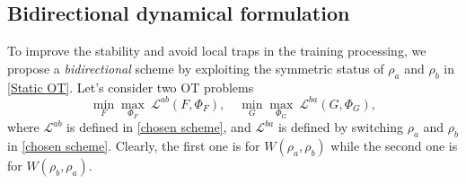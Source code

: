 \documentclass{article}
\newcommand{\zha}[1]{{\color{red} Zha: #1}}
\begin{document}
\subsection{Bidirectional dynamical formulation}
To improve the stability and avoid local traps in the training processing, we propose a {\it bidirectional} scheme by exploiting the symmetric status of $
\rho_a$ and $\rho_b$ in \eqref{Static OT}.  
Let's consider two OT problems
\begin{equation*}
    \min_{{F}}\max_{\Phi_F} ~ \mathcal{L}^{ab}({F}, \Phi_F), \quad 
  \min_{ {G} }\max_{\Phi_G} ~ \mathcal{L}^{ba}({G}, \Phi_G),
\end{equation*}
where $\mathcal{L}^{ab}$ is defined in \eqref{chosen scheme}, and $\mathcal{L}^{ba}$ is defined by switching $\rho_a$ and $\rho_b$ in \eqref{chosen scheme}. Clearly, the first one is for $W(\rho_a,\rho_b)$ while the second one is for $W(\rho_b, \rho_a)$.
\end{document}

